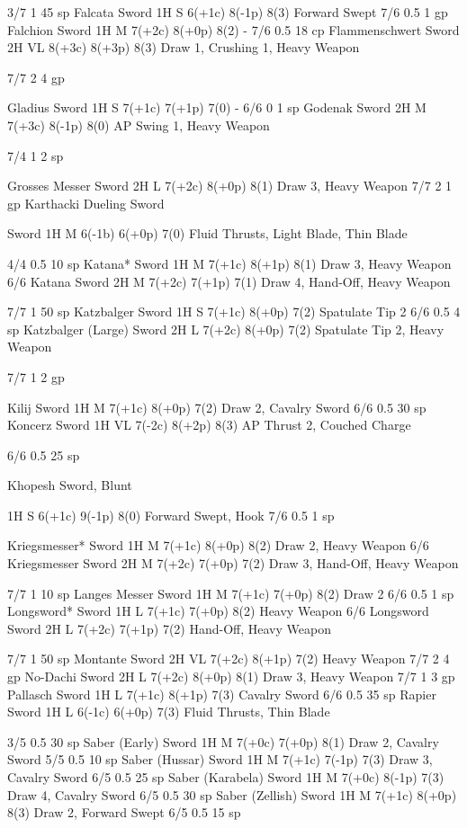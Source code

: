 \documentclass[oneside,11pt,english]{book}
\begin{document}
3/7 1 45 
sp 
Falcata Sword 1H S 6(+1c) 8(-1p) 8(3) Forward Swept 7/6 0.5 1 gp 
Falchion Sword 1H M 7(+2c) 8(+0p) 8(2) - 7/6 0.5 18 
cp 
Flammenschwert Sword 2H VL 8(+3c) 8(+3p) 8(3) Draw 1, Crushing 1, 
Heavy Weapon 

7/7 2 4 gp 


Gladius Sword 1H S 7(+1c) 7(+1p) 7(0) - 6/6 0 1 sp 
Godenak Sword 2H M 7(+3c) 8(-1p) 8(0) AP Swing 1, Heavy 
Weapon 

7/4 1 2 sp 

Grosses Messer Sword 2H L 7(+2c) 8(+0p) 8(1) Draw 3, Heavy Weapon 7/7 2 1 gp 
Karthacki Dueling 
Sword 

Sword 1H M 6(-1b) 6(+0p) 7(0) Fluid Thrusts, Light 
Blade, Thin Blade 

4/4 0.5 10 
sp 
Katana* Sword 1H M 7(+1c) 8(+1p) 8(1) Draw 3, Heavy Weapon 6/6 
Katana Sword 2H M 7(+2c) 7(+1p) 7(1) Draw 4, Hand-Off, 
Heavy Weapon 

7/7 1 50 
sp 
Katzbalger Sword 1H S 7(+1c) 8(+0p) 7(2) Spatulate Tip 2 6/6 0.5 4 sp 
Katzbalger (Large) Sword 2H L 7(+2c) 8(+0p) 7(2) Spatulate Tip 2, Heavy 
Weapon 

7/7 1 2 gp 

Kilij Sword 1H M 7(+1c) 8(+0p) 7(2) Draw 2, Cavalry Sword 6/6 0.5 30 
sp 
Koncerz Sword 1H VL 7(-2c) 8(+2p) 8(3) AP Thrust 2, Couched 
Charge 

6/6 0.5 25 
sp 

Khopesh Sword, 
Blunt 

1H S 6(+1c) 9(-1p) 8(0) Forward Swept, Hook 7/6 0.5 1 sp 

Kriegsmesser* Sword 1H M 7(+1c) 8(+0p) 8(2) Draw 2, Heavy Weapon 6/6 
Kriegsmesser Sword 2H M 7(+2c) 7(+0p) 7(2) Draw 3, Hand-Off, 
Heavy Weapon 

7/7 1 10 
sp 
Langes Messer Sword 1H M 7(+1c) 7(+0p) 8(2) Draw 2 6/6 0.5 1 sp 
Longsword* Sword 1H L 7(+1c) 7(+0p) 8(2) Heavy Weapon 6/6 
Longsword Sword 2H L 7(+2c) 7(+1p) 7(2) Hand-Off, Heavy 
Weapon 

7/7 1 50 
sp 
Montante Sword 2H VL 7(+2c) 8(+1p) 7(2) Heavy Weapon 7/7 2 4 gp 
No-Dachi Sword 2H L 7(+2c) 8(+0p) 8(1) Draw 3, Heavy Weapon 7/7 1 3 gp 
Pallasch Sword 1H L 7(+1c) 8(+1p) 7(3) Cavalry Sword 6/6 0.5 35 
sp 
Rapier Sword 1H L 6(-1c) 6(+0p) 7(3) Fluid Thrusts, Thin 
Blade 

3/5 0.5 30 
sp 
Saber (Early) Sword 1H M 7(+0c) 7(+0p) 8(1) Draw 2, Cavalry Sword 5/5 0.5 10 
sp 
Saber (Hussar) Sword 1H M 7(+1c) 7(-1p) 7(3) Draw 3, Cavalry Sword 6/5 0.5 25 
sp 
Saber (Karabela) Sword 1H M 7(+0c) 8(-1p) 7(3) Draw 4, Cavalry Sword 6/5 0.5 30 
sp 
Saber (Zellish) Sword 1H M 7(+1c) 8(+0p) 8(3) Draw 2, Forward Swept 6/5 0.5 15 
sp 
\end{document}
